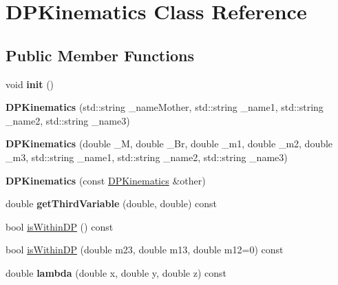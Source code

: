 \hypertarget{class_d_p_kinematics}{\section{D\-P\-Kinematics Class Reference}
\label{class_d_p_kinematics}
}
\subsection*{Public Member Functions}
\begin{DoxyCompactItemize}
\item 
\hypertarget{class_d_p_kinematics_aa5060c171885a9713489adf994b07487}{void {\bfseries init} ()}\label{class_d_p_kinematics_aa5060c171885a9713489adf994b07487}

\item 
\hypertarget{class_d_p_kinematics_a1498d76a038a32f75f8ce11148677722}{{\bfseries D\-P\-Kinematics} (std\-::string \-\_\-name\-Mother, std\-::string \-\_\-name1, std\-::string \-\_\-name2, std\-::string \-\_\-name3)}\label{class_d_p_kinematics_a1498d76a038a32f75f8ce11148677722}

\item 
\hypertarget{class_d_p_kinematics_a0bd1e812df4a9192db40018bd9525ffa}{{\bfseries D\-P\-Kinematics} (double \-\_\-\-M, double \-\_\-\-Br, double \-\_\-m1, double \-\_\-m2, double \-\_\-m3, std\-::string \-\_\-name1, std\-::string \-\_\-name2, std\-::string \-\_\-name3)}\label{class_d_p_kinematics_a0bd1e812df4a9192db40018bd9525ffa}

\item 
\hypertarget{class_d_p_kinematics_aee40e4e37a7c594d55444335e2ff3f4a}{{\bfseries D\-P\-Kinematics} (const \hyperlink{class_d_p_kinematics}{D\-P\-Kinematics} \&other)}\label{class_d_p_kinematics_aee40e4e37a7c594d55444335e2ff3f4a}

\item 
\hypertarget{class_d_p_kinematics_ae9e44bf9f2bc2f495322adfd5fdbf57c}{double {\bfseries get\-Third\-Variable} (double, double) const }\label{class_d_p_kinematics_ae9e44bf9f2bc2f495322adfd5fdbf57c}

\item 
bool \hyperlink{class_d_p_kinematics_ae843ba2db88bc94d82b230bfff246bf9}{is\-Within\-D\-P} () const 
\item 
bool \hyperlink{class_d_p_kinematics_a7f457f7d0bb254e335d1d7b6f9db8ffd}{is\-Within\-D\-P} (double m23, double m13, double m12=0) const 
\item 
\hypertarget{class_d_p_kinematics_a964da8691ae0a8a185a6905fa912dfed}{double {\bfseries lambda} (double x, double y, double z) const }\label{class_d_p_kinematics_a964da8691ae0a8a185a6905fa912dfed}


\end{DoxyCompactItemize}
